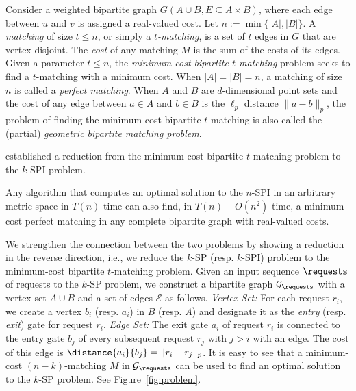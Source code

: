  Consider a weighted bipartite graph $G(A\cup B, E\subseteq A\times B)$, where each edge between $u$ and $v$ is assigned a real-valued cost. Let $n:=\min\{|A|, |B|\}$. A \emph{matching} of size $t\le n$, or simply a \emph{$t$-matching}, is a set of $t$ edges in $G$ that are vertex-disjoint. The \emph{cost} of any matching $M$ is the sum of the costs of its edges. Given a parameter $t \le n$, the \emph{minimum-cost bipartite $t$-matching} problem seeks to find a $t$-matching with a minimum cost. 
When $|A|=|B|=n$, a matching of size $n$ is called a \emph{perfect matching}. When $A$ and $B$ are $d$-dimensional point sets and the cost of any edge between $a \in A$ and $b \in B$ is the $\ell_p$ distance $\|a-b\|_p$, the problem of finding the minimum-cost bipartite $t$-matching is also called the (partial) \emph{geometric bipartite matching problem}. 


%


\citet{chrobak1991new} established a reduction from the minimum-cost bipartite $t$-matching problem to the $k$-SPI problem.
\begin{lemma}\cite[Theorem 11]{chrobak1991new}
\label{lem:spimatch}
Any algorithm that computes an optimal solution to the $n$-SPI in an arbitrary metric space in $T(n)$ time can also find, in $T(n)+O(n^2)$ time, a minimum-cost perfect matching in any complete bipartite graph with real-valued costs.
\end{lemma}

We strengthen the connection between the two problems by showing a reduction in the reverse direction, i.e., we reduce the $k$-SP (resp. $k$-SPI) problem to the minimum-cost bipartite $t$-matching problem.
Given an input sequence $\requests$ of requests to the $k$-SP problem, we construct a bipartite graph $\mathcal{G}_{\requests}$ with a vertex set $A\cup B$ and a set of edges $\mathcal{E}$ as follows. 
{\it Vertex Set:} For each request $r_i$, we create a vertex $b_i$ (resp. $a_i$) in $B$ (resp. $A$) and designate it as the \emph{entry} (resp. \emph{exit}) gate for request $r_i$. 
{\it Edge Set:} The exit gate $a_i$ of request $r_i$ is connected to the entry gate $b_j$ of every subsequent request $r_j$ with $j > i$ with an edge. The cost of this edge is $\distance{a_i}{b_j}=\|r_i-r_j\|_p$. 
It is easy to see that a minimum-cost $(n-k)$-matching $M$ in $\mathcal{G}_\requests$ can be used to find an optimal solution to the $k$-SP problem. See Figure~\ref{fig:problem}. 

